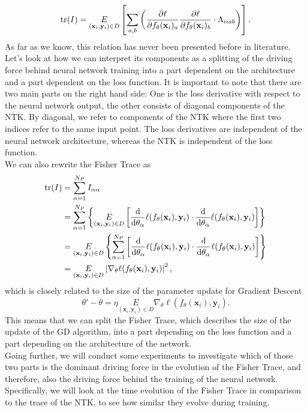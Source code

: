 \begin{equation}\label{eq:FisherNTKRelation}
	\mathrm{tr}(I) = \underset{(\mathbf{x}_i, \mathbf{y}_i) \in D}{E} \left[\sum_{a,b} \left(\frac{\partial\ell}{\partial f_\theta(\mathbf{x}_i)_a}\frac{\partial\ell}{\partial f_\theta(\mathbf{x}_i)_b} \cdot \Lambda_{iiab}\right)\right].
\end{equation}
As far as we know, this relation has never been presented before in literature. Let's look at how we can interpret 
its components as a splitting of the driving force behind neural network training into a part dependent on the architecture and a part dependent on the loss function. It is important to note that there are two main parts on the right hand side: One is the loss derivative with respect to the neural network output, the other consists of diagonal components of the NTK. By diagonal, we refer to components of the NTK where the first two indices refer to the same input point. The loss derivatives are independent of the neural network architecture, whereas the NTK is independent of the loss function.\\
We can also rewrite the Fisher Trace as
\begin{equation}
	\begin{split}
		\mathrm{tr}(I) &= \sum_{\alpha = 1}^{N_P} I_{\alpha\alpha}\\
		&= \sum_{\alpha = 1}^{N_P} \left\{\underset{(\mathbf{x}_i, \mathbf{y}_i) \in D}{E} \left[\frac{\mathrm{d}}{\mathrm{d}\theta_\alpha}\ell(f_\theta(\mathbf{x}_i),\mathbf{y}_i)\cdot \frac{\mathrm{d}}{\mathrm{d}\theta_\alpha}\ell(f_\theta(\mathbf{x}_i),\mathbf{y}_i)\right]\right\}\\
		&= \underset{(\mathbf{x}_i, \mathbf{y}_i) \in D}{E} \left\{\sum_{\alpha = 1}^{N_P} \left[\frac{\mathrm{d}}{\mathrm{d}\theta_\alpha}\ell(f_\theta(\mathbf{x}_i),\mathbf{y}_i)\cdot \frac{\mathrm{d}}{\mathrm{d}\theta_\alpha}\ell(f_\theta(\mathbf{x}_i),\mathbf{y}_i)\right]\right\}\\
		&= \underset{(\mathbf{x}_i, \mathbf{y}_i) \in D}{E} \left|\nabla_\theta \ell(f_\theta(\mathbf{x}_i),\mathbf{y}_i) \right|^2,
	\end{split}
\end{equation}
which is closely related to the size of the parameter update for Gradient Descent
\begin{equation}
	\theta' - \theta =  \eta \underset{(\mathbf{x}_i, \mathbf{y}_i) \in D}{E} \nabla_\theta \ell(f_\theta(\mathbf{x}_i),\mathbf{y}_i).
\end{equation}
This means that we can split the Fisher Trace, which describes the size of the update of the GD algorithm, into a part depending on the loss function and a part depending on the architecture of the network.\\
Going further, we will conduct some experiments to investigate which of those two parts is the dominant driving force in the evolution of the Fisher Trace, and therefore, also the driving force behind the training of the neural network. Specifically, we will look at the time evolution of the Fisher Trace in comparison to the trace of the NTK, to see how similar they evolve during training.

